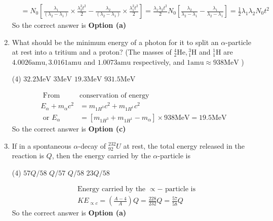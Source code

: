 \begin{enumerate}
\begin{answer}
\begin{align*}
		&=N_0\left[\frac{\lambda_1}{\left(\lambda_2-\lambda_1\right)} \times \frac{\lambda_2^2 t^2}{2}-\frac{\lambda_2}{\left(\lambda_2-\lambda_1\right)} \times \frac{\lambda_1^2 t^2}{2}\right]=\frac{\lambda_1 \lambda_2 t^2}{2} N_0\left[\frac{\lambda_2}{\lambda_2-\lambda_1}-\frac{\lambda_1}{\lambda_2-\lambda_1}\right]=\frac{1}{2} \lambda_1 \lambda_2 N_0 t^2
		\end{align*}
		So the correct answer is \textbf{Option (a)}
	\end{answer}
	\item What should be the minimum energy of a photon for it to split an $\alpha$-particle at rest into a tritium and a proton?
	(The masses of ${ }_2^4 \mathrm{He},{ }_1^3 \mathrm{H}$ and ${ }_1^1 \mathrm{H}$ are $4.0026 \mathrm{amu}, 3.0161 \mathrm{amu}$ and $1.0073 \mathrm{amu}$ respectively, and $1 \mathrm{amu} \approx 938 \mathrm{MeV}$ )
	{}
	\begin{tasks}(4)
		\task[\textbf{a.}]$32.2 \mathrm{MeV}$
		\task[\textbf{b.}]$3 \mathrm{MeV}$
		\task[\textbf{c.}]$19.3 \mathrm{MeV}$
		\task[\textbf{d.}] $931.5 \mathrm{MeV}$
	\end{tasks}
	\begin{answer}
		\begin{align*}
		\text{ From }&\text{conservation of energy}\\
		E_\alpha+m_\alpha c^2&=m_{1 H^3} c^2+m_{1 H^1} c^2 \\
		\text { or } E_\alpha&=\left[m_{1 H^3}+m_{1 H^1}-m_\alpha\right] \times 938 \mathrm{MeV}=19.5 \mathrm{MeV}
		\end{align*}
		So the correct answer is \textbf{Option (c)}
	\end{answer}
	\item If in a spontaneous $\alpha$-decay of ${ }_{92}^{232} U$ at rest, the total energy released in the reaction is $Q$, then the energy carried by the $\alpha$-particle is
	{}
	\begin{tasks}(4)
		\task[\textbf{a.}]$57 Q / 58$
		\task[\textbf{b.}]$Q / 57$
		\task[\textbf{c.}]$Q / 58$
		\task[\textbf{d.}] $23 Q / 58$
	\end{tasks}
	\begin{answer}
		\begin{align*}
		&\text{Energy carried by the $\propto-$ particle is}\\
		&K E_{\propto c}=\left(\frac{A-4}{A}\right) Q=\frac{228}{232} Q=\frac{57}{58} Q
		\end{align*}
		So the correct answer is \textbf{Option (a)}

\end{answer}
\end{enumerate}
